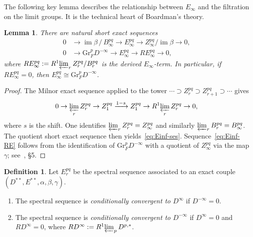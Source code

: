 \documentclass[12pt,a4paper]{article}
\newtheorem{lemma}[theorem]{Lemma}
\theoremstyle{definition}
\newtheorem{definition}[theorem]{Definition}
\newcommand{\Gr}{\mathrm{Gr}}
\begin{document}
The following key lemma describes the relationship between $E_\infty$ and the
filtration on the limit groups.  It is the technical heart of Boardman's theory.

\begin{lemma}\label{lem:Einf-and-filtration}
There are natural short exact sequences
\begin{align}
  0 &\longrightarrow \operatorname{im}\beta\,/\,B_\infty^{pq}
      \longrightarrow E_\infty^{pq}
      \longrightarrow Z_\infty^{pq}/\operatorname{im}\beta
      \longrightarrow 0, \label{eq:Einf-ses}\\
  0 &\longrightarrow \Gr_F^p D^{-\infty}
      \longrightarrow E_\infty^{pq}
      \longrightarrow RE_\infty^{pq}
      \longrightarrow 0, \label{eq:Einf-RE}
\end{align}
where $RE_\infty^{pq}:=R^1\!\varprojlim_r Z_r^{pq}/B_r^{pq}$ is the derived
$E_\infty$-term.  In particular, if $RE_\infty^{pq}=0$, then
$E_\infty^{pq}\cong\Gr_F^p D^{-\infty}$.
\end{lemma}
\begin{proof}
The Milnor exact sequence applied to the tower
$\cdots\supset Z_r^{pq}\supset Z_{r+1}^{pq}\supset\cdots$ gives
\[
  0\to\varprojlim_r Z_r^{pq}\to Z_1^{pq}\xrightarrow{1-s}
  Z_1^{pq}\to R^1\!\varprojlim_r Z_r^{pq}\to 0,
\]
where $s$ is the shift.  One identifies $\varprojlim_r Z_r^{pq}= Z_\infty^{pq}$
and similarly $\varprojlim_r B_r^{pq}=B_\infty^{pq}$.  The quotient short exact
sequence then yields~\eqref{eq:Einf-ses}.  Sequence~\eqref{eq:Einf-RE} follows from
the identification of $\Gr_F^p D^{-\infty}$ with a quotient of $Z_\infty^{pq}$
via the map $\gamma$; see~\cite{Boa99}, \S5.
\end{proof}

\begin{definition}\label{def:conditional-convergence}
Let $E_r^{pq}$ be the spectral sequence associated to an exact couple
$(D^{**},E^{**},\alpha,\beta,\gamma)$.
\begin{enumerate}
  \item The spectral sequence is \emph{conditionally convergent to $D^\infty$}
    if $D^{-\infty}=0$.
  \item The spectral sequence is \emph{conditionally convergent to $D^{-\infty}$}
    if $D^\infty=0$ and $RD^\infty=0$, where
    $RD^\infty:=R^1\!\varprojlim_p D^{p,*}$.
\end{enumerate}
\end{definition}
\end{document}
